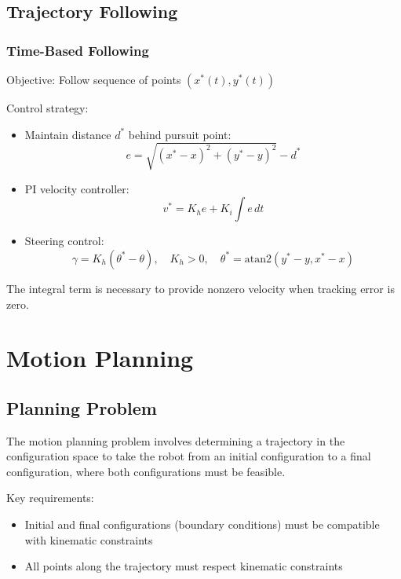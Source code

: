\documentclass[openany]{book}
\theoremstyle{definition}
\theoremstyle{remark}
\newcommand{\definitionbox}[1]{
\begin{tcolorbox}[colback=blue!5,colframe=blue!40!black,title=Definition]
 #1
\end{tcolorbox}
}
\newcommand{\note}[1]{
\begin{tcolorbox}[colback=green!5,colframe=green!40!black,title=Note]
 #1
\end{tcolorbox}
}
\begin{document}
\section{Trajectory Following}

\subsection{Time-Based Following}
Objective: Follow sequence of points $(x^*(t), y^*(t))$

Control strategy:
\begin{itemize}
    \item Maintain distance $d^*$ behind pursuit point:
        \begin{equation}
            e = \sqrt{(x^* - x)^2 + (y^* - y)^2} - d^*
        \end{equation}
    
    \item PI velocity controller:
        \begin{equation}
            v^* = K_he + K_i\int e\,dt
        \end{equation}
    
    \item Steering control:
        \begin{equation}
            \gamma = K_h(\theta^* - \theta), \quad K_h > 0, \quad \theta^* = \text{atan2}(y^* - y, x^* - x)
        \end{equation}
\end{itemize}

\note{The integral term is necessary to provide nonzero velocity when tracking error is zero.}

\chapter{Motion Planning}

\section{Planning Problem}

\definitionbox{The motion planning problem involves determining a trajectory in the configuration space to take the robot from an initial configuration to a final configuration, where both configurations must be feasible.}

Key requirements:
\begin{itemize}
    \item Initial and final configurations (boundary conditions) must be compatible with kinematic constraints
    \item All points along the trajectory must respect kinematic constraints
\end{itemize}
\end{document}
